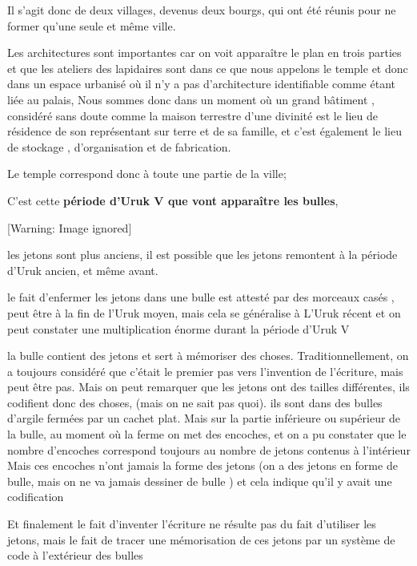\documentclass[a4paper,10pt]{article}
\begin{document}
Il s'agit donc de deux villages, devenus deux bourgs,
qui ont été réunis pour ne former qu'une seule et même
ville.

Les architectures sont importantes car on voit apparaître le plan en
trois parties et que les ateliers des lapidaires sont dans ce que nous
appelons le temple et donc dans un espace urbanisé où il
n'y a pas d'architecture 
identifiable comme étant liée au palais,  Nous sommes donc dans un
moment où un grand bâtiment , considéré sans doute comme la maison
terrestre d'une divinité est le lieu de résidence de
son représentant sur terre et de sa famille, et c'est
également le lieu de stockage , d'organisation et de
fabrication.

Le temple correspond donc à toute une partie de la ville;

C'est  cette \textbf{période d'Uruk V
que vont apparaître les bulles}, 

  [Warning: Image ignored] %
 

les jetons sont plus anciens, il est possible que les jetons remontent à
la période d'Uruk ancien, et même avant.

le fait d'enfermer les jetons dans une bulle est
attesté par des morceaux casés , peut être à la fin de
l'Uruk moyen, mais cela se généralise à
L'Uruk récent et on peut constater une multiplication
énorme durant la période d'Uruk V

la bulle contient des jetons et sert à mémoriser des choses.
Traditionnellement, on a toujours considéré que
c'était le premier pas vers
l'invention de l'écriture, mais peut
être pas. Mais on peut remarquer que les jetons ont des tailles
différentes, ils codifient donc des choses, (mais on ne sait pas quoi).
ils sont dans des bulles d'argile fermées par un
cachet plat. Mais sur la partie inférieure ou supérieur de la bulle, au
moment où la ferme on met des encoches, et on a pu constater que le
nombre d'encoches correspond toujours au nombre de
jetons contenus à l'intérieur Mais ces encoches
n'ont jamais la forme des jetons  (on a des jetons en
forme de bulle, mais on ne va jamais dessiner de bulle ) et cela
indique qu'il y avait une codification

Et finalement le fait d'inventer
l'écriture ne résulte pas du fait
d'utiliser les jetons, mais le fait de tracer une
mémorisation de ces jetons par un système de code à
l'extérieur des bulles
\end{document}
